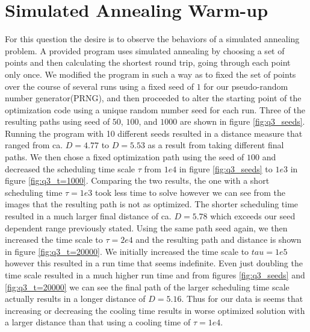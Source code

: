 \documentclass{article}
\begin{document}
\section{Simulated Annealing Warm-up}
For this question the desire is to observe the behaviors of a simulated annealing problem. A provided program uses simulated annealing by choosing a set of points and then calculating the shortest round trip, going through each point only once. We modified the program in such a way as to fixed the set of points over the course of several runs using a fixed seed of $1$ for our pseudo-random number generator(PRNG), and then proceeded to alter the starting point of the optimization code using a unique random number seed for each run. Three of the resulting paths using seed of $50$, $100$, and $1000$ are shown in figure \ref{fig:q3_seeds}. Running the program with 10 different seeds resulted in a distance measure that ranged from ca. $D=4.77$ to $D=5.53$ as a result from taking different final paths. 
We then chose a fixed optimization path using the seed of $100$ and decreased the scheduling time scale $\tau$ from $1e4$ in figure \ref{fig:q3_seeds} to $1e3$ in figure \ref{fig:q3_t=1000}. Comparing the two results, the one with a short scheduling time $\tau=1e3$ took less time to solve however we can see from the images that the resulting path is not as optimized. The shorter scheduling time resulted in a much larger final distance of ca. $D=5.78$ which exceeds our seed dependent range previously stated. Using the same path seed again, we then increased the time scale to $\tau=2e4$ and the resulting path and distance is shown in figure \ref{fig:q3_t=20000}. We initially increased the time scale to $tau=1e5$ however this resulted in a run time that seems indefinite. Even just doubling the time scale resulted in a much higher run time and from figures \ref{fig:q3_seeds} and \ref{fig:q3_t=20000} we can see the final path of the larger scheduling time scale actually results in a longer distance of $D=5.16$. Thus for our data is seems that increasing or decreasing the cooling time results in worse optimized solution with a larger distance than that using a cooling time of $\tau=1e4$. 
\end{document}
